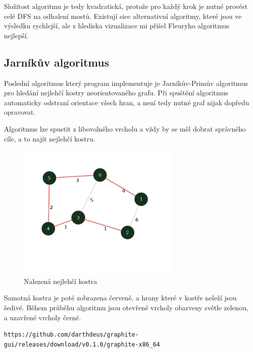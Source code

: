 \documentclass{article}
\begin{document}
Složitost algoritmu je tedy kvadratická, protože pro každý krok je nutné
provést celé DFS na odhalení mostů. Existují sice alternativní
algoritmy, které jsou ve výsledku rychlejší, ale z hlediska vizualizace mi přišel
Fleuryho algoritmus nejlepší.

\pagebreak

\subsection{Jarníkův algoritmus}

Poslední algoritmus který program implementuje je Jarníkův-Primův algoritmus
pro hledání nejlehčí kostry neorientovaného grafu. Při spuštění algoritmus automaticky
odstraní orientace všech hran, a není tedy nutné graf nijak dopředu opravovat.

Algoritmus lze spustit z libovolného vrcholu a vždy by se měl dobrat správného cíle,
a to najít nejlehčí kostru.

\begin{figure}[!h]
	\centering
	\includegraphics[width=0.7\textwidth]{kostra.png}
	\caption{Nalezená nejlehčí kostra}
\end{figure}

Samotná kostra je poté zobrazena červeně, a hrany které v kostře neleží jsou šedivé. Během průběhu
algoritmu jsou otevřené vrcholy obarveny světle zelenou, a uzavřené vrcholy černé.

\begin{thebibliography}{5}
	 \texttt{https://github.com/darthdeus/graphite-gui/releases/download/v0.1.0/graphite-x86\_64}
\end{thebibliography}
\end{document}
